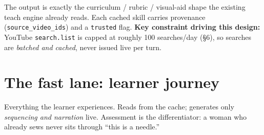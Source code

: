 \documentclass[11pt]{article}
\newcommand{\code}[1]{\texttt{#1}}
\begin{document}
\noindent The output is exactly the curriculum / rubric / visual-aid shape the existing teach engine
already reads. Each cached skill carries provenance (\code{source\_video\_ids}) and a \code{trusted}
flag. \textbf{Key constraint driving this design:} YouTube \code{search.list} is capped at roughly
100 searches/day (\S6), so searches are \emph{batched and cached}, never issued live per turn.

\section{The fast lane: learner journey}

Everything the learner experiences. Reads from the cache; generates only \emph{sequencing and
narration} live. Assessment is the differentiator: a woman who already sews never sits through
``this is a needle.''
\end{document}

